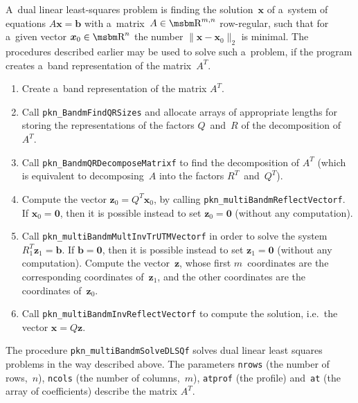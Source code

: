 \begin{sloppypar}
A~dual linear least-squares problem is finding the solution~$\bm{x}$
of a~system of equations $A\bm{x}=\bm{b}$ with a~matrix~$A\in\R^{m,n}$
row-regular, such that for a~given vector $\bm{x}_0\in\R^n$
the number $\|\bm{x}-\bm{x}_0\|_2$ is minimal. The procedures described
earlier may be used to solve such a~problem, if the program creates
a~band representation of the matrix~$A^T$.
\end{sloppypar}
\begin{enumerate}
  \item Create a~band representation of the matrix $A^T$.
  \item Call \texttt{pkn\_BandmFindQRSizes} and allocate arrays
    of appropriate lengths for storing the representations of the factors
    $Q$~and~$R$ of the decomposition of $A^T$.
  \item Call \texttt{pkn\_BandmQRDecomposeMatrixf} to find the decomposition
    of $A^T$ (which is equivalent to decomposing~$A$ into the factors
    $R^T$~and~$Q^T$).
  \item Compute the vector $\bm{z}_0=Q^T\bm{x}_0$, by calling
    \texttt{pkn\_multiBandmReflectVectorf}. If $\bm{x}_0=\bm{0}$,
    then it is possible instead to set $\bm{z}_0=\bm{0}$ (without any
    computation).
  \item\begin{sloppypar}%
    Call \texttt{pkn\_multiBandmMultInvTrUTMVectorf} in order to
    solve the system $R_1^T\bm{z}_1=\bm{b}$. If
    $\bm{b}=\bm{0}$, then it is possible instead to set $\bm{z}_1=\bm{0}$
    (without any computation).
    Compute the vector~$\bm{z}$, whose first $m$~coordinates
    are the corresponding coordinates of~$\bm{z}_1$,
    and the other coordinates are the coordinates of~$\bm{z}_0$.%
    \end{sloppypar}
  \item Call \texttt{pkn\_multiBandmInvReflectVectorf} to compute
    the solution, i.e.\ the vector $\bm{x}=Q\bm{z}$.
\end{enumerate}

\vspace{\bigskipamount}
\begin{sloppypar}
The procedure \texttt{pkn\_multiBandmSolveDLSQf} solves dual linear least
squares problems in the way described above. The parameters \texttt{nrows}
(the number of rows,~$n$), \texttt{ncols} (the number of columns,~$m$),
\texttt{atprof} (the profile) and~\texttt{at} (the array of coefficients)
describe the matrix $A^T$.
\end{sloppypar}


